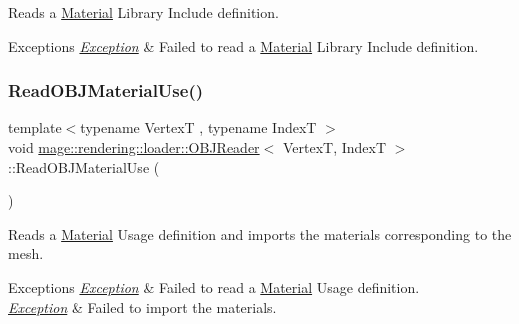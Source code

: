 Reads a \mbox{\hyperlink{classmage_1_1rendering_1_1_material}{Material}} Library Include definition.


\begin{DoxyExceptions}{Exceptions}
{\em \mbox{\hyperlink{classmage_1_1_exception}{Exception}}} & Failed to read a \mbox{\hyperlink{classmage_1_1rendering_1_1_material}{Material}} Library Include definition. \\
\hline
\end{DoxyExceptions}
\mbox{\label{classmage_1_1rendering_1_1loader_1_1_o_b_j_reader_a5aa719224a08175bcbcb26873e2fb5e1}} 
\subsubsection{\texorpdfstring{Read\+O\+B\+J\+Material\+Use()}{ReadOBJMaterialUse()}}
{\footnotesize\ttfamily template$<$typename VertexT , typename IndexT $>$ \\
void \mbox{\hyperlink{classmage_1_1rendering_1_1loader_1_1_o_b_j_reader}{mage\+::rendering\+::loader\+::\+O\+B\+J\+Reader}}$<$ VertexT, IndexT $>$\+::Read\+O\+B\+J\+Material\+Use (\begin{DoxyParamCaption}{ }\end{DoxyParamCaption})\hspace{0.3cm}{\ttfamily [private]}}

Reads a \mbox{\hyperlink{classmage_1_1rendering_1_1_material}{Material}} Usage definition and imports the materials corresponding to the mesh.


\begin{DoxyExceptions}{Exceptions}
{\em \mbox{\hyperlink{classmage_1_1_exception}{Exception}}} & Failed to read a \mbox{\hyperlink{classmage_1_1rendering_1_1_material}{Material}} Usage definition. \\
\hline
{\em \mbox{\hyperlink{classmage_1_1_exception}{Exception}}} & Failed to import the materials. \\
\hline
\end{DoxyExceptions}
\mbox{\label{classmage_1_1rendering_1_1loader_1_1_o_b_j_reader_a519f333ce13777d469c63eae7ab8dcf4}} 
